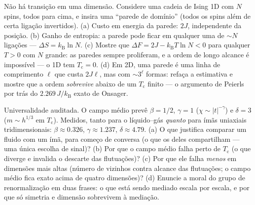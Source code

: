 \begin{exercise}[$\star\star\star$]\label{exo:b3:phase-transitions:10}
Não há transição em uma dimensão. Considere uma cadeia de Ising 1D com
$N$ spins, todos para cima, e insira uma ``parede de domínio'' (todos os
spins além de certa ligação invertidos). (a) Custo em energia da parede:
$2J$, independente da posição. (b) Ganho de entropia: a parede pode
ficar em qualquer uma de $\sim N$ ligações --- $\Delta S = k_{\text{B}}\ln N$. (c)
Mostre que $\Delta F = 2J - k_{\text{B}}T\ln N < 0$ para qualquer $T > 0$ com
$N$ grande: as paredes sempre proliferam, e a ordem de longo alcance é
impossível --- o  1D tem $T_{\text{c}} = 0$. (d) Em
2D, uma parede é uma linha de comprimento $\ell$ que custa $2J\ell$, mas com
$\sim3^\ell$ formas: refaça a estimativa e mostre que a ordem
\emph{sobrevive} abaixo de um $T_{\text{c}}$ finito --- o
argumento de Peierls por trás do $2.269\,J/k_{\text{B}}$ exato de Onsager.
\end{exercise}

\begin{exercise}[$\star\star\star$]\label{exo:b3:phase-transitions:11}
Universalidade auditada. O campo médio prevê $\beta = 1/2$, $\gamma
= 1$ ($\chi \sim |t|^{-\gamma}$) e $\delta = 3$ ($m \sim h^{1/3}$
em $T_{\text{c}}$). Medidos, tanto para o  líquido--gás
\emph{quanto} para ímãs uniaxiais tridimensionais: $\beta
\approx 0.326$, $\gamma \approx 1.237$, $\delta \approx 4.79$.
(a) O que justifica comparar um fluido com um ímã, para começo de
conversa (o que os  deles compartilham --- uma única
escolha de sinal)? (b)
Por que o campo médio falha perto de $T_{\text{c}}$ (o que diverge e
invalida o descarte das flutuações)? (c) Por que ele falha
\emph{menos} em dimensões mais altas (número de vizinhos contra
alcance das flutuações; o campo médio fica exato acima de quatro
dimensões)? (d) Enuncie a moral do grupo de renormalização em duas
frases: o que está sendo mediado escala por escala, e por que só
simetria e dimensão sobrevivem à mediação.
\end{exercise}

